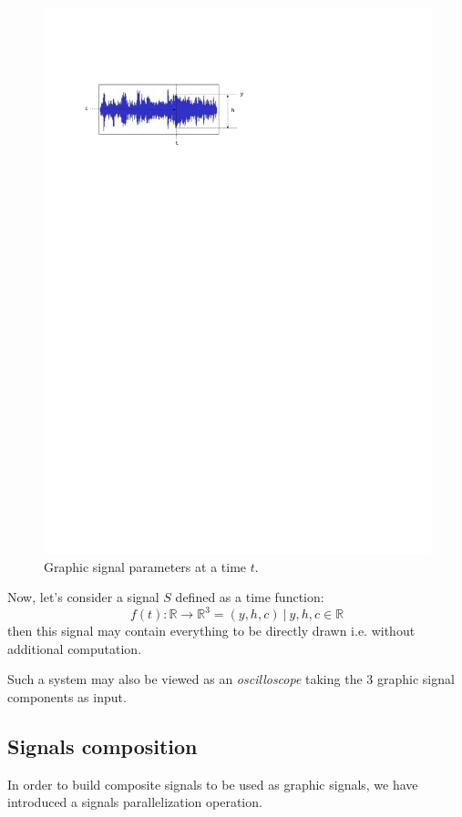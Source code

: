 \documentclass{article}
\begin{document}
\begin{figure}[htbp]
\centerline{
	\includegraphics[width=0.90\columnwidth]{imgs/graph}}
\caption{Graphic signal parameters at a time $t$.}
\label{fig:siggraph}
\end{figure}

Now, let's consider a signal $S$ defined as a time function:
\[f(t)  : \mathbb{R} \rightarrow \mathbb{R}^3 =  (y, h, c)\ |\ y, h, c \in \mathbb{R} \]
then this signal may contain everything to be directly drawn i.e. without additional computation.

Such a system may also be viewed as an \emph{oscilloscope} taking the 3 graphic signal components as input.


\subsection{Signals composition}

In order to build composite signals to be used as graphic signals, we have introduced a signals parallelization operation.
\end{document}
